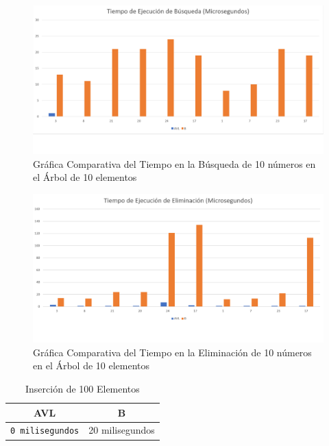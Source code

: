 \documentclass[acmsmall]{acmart}
\begin{document}
\begin{figure}[h]
  \centering
  \caption{Gráfica Comparativa del Tiempo en la Búsqueda de 10 números en el Árbol de 10 elementos}

  \includegraphics[angle=0,scale=0.5]{10.2 elem.png}
  
\end{figure}
\begin{figure}[h]
  \centering
  \caption{Gráfica Comparativa del Tiempo en la Eliminación de 10 números en el Árbol de 10 elementos}

  \includegraphics[angle=0,scale=0.5]{10.3 elem.png}
  
\end{figure}
\clearpage


\begin{table}[htbp]
\begin{center}
  \caption{Inserción de 100 Elementos}
  \begin{tabular}{cc}
    \toprule
    AVL & B\\
    \midrule
    \texttt{0 milisegundos} & 20 milisegundos \\
    \bottomrule
  \end{tabular}
  \end{center}
\end{table}
\end{document}
